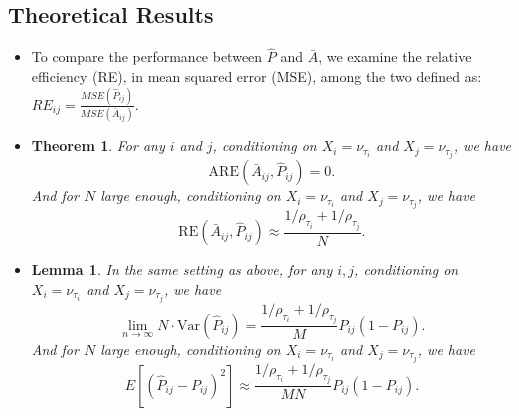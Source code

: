 \documentclass[a4paper]{article}
\newtheorem{lemma}[fact]{Lemma}
\newtheorem{theorem}[fact]{Theorem}
\begin{document}
\subsection{Theoretical Results}
\begin{itemize}
\item To compare the performance between $\hat{P}$ and $\bar{A}$, we examine the relative efficiency (RE), in mean squared error (MSE), among the two defined as: $RE_{ij} = \frac{MSE(\hat{P}_{ij})}{MSE(\bar{A}_{ij})}$.
\item
\begin{theorem}
\label{thm:ARE}
For any $i$ and $j$, conditioning on $X_i = \nu_{\tau_i}$ and $X_j = \nu_{\tau_j}$, we have
\[
	\mathrm{ARE}(\bar{A}_{ij}, \hat{P}_{ij}) = 0.
\]
And for $N$ large enough, conditioning on $X_i = \nu_{\tau_i}$ and $X_j = \nu_{\tau_j}$, we have
\[
	\mathrm{RE}(\bar{A}_{ij}, \hat{P}_{ij}) \approx
    \frac{1/\rho_{\tau_i} + 1/\rho_{\tau_j}}{N}.
\]
\end{theorem}
\item
\begin{lemma}
\label{lm:VarPhat}
In the same setting as above, for any $i, j$, conditioning on $X_i = \nu_{\tau_i}$ and $X_j = \nu_{\tau_j}$, we have
\[
	\lim_{n \to \infty} N \cdot \mathrm{Var}(\hat{P}_{ij}) =
    \frac{1/\rho_{\tau_i} + 1/\rho_{\tau_j}}{M} P_{ij} (1 - P_{ij}).
\]
And for $N$ large enough, conditioning on $X_i = \nu_{\tau_i}$ and $X_j = \nu_{\tau_j}$, we have
\[
	E[(\hat{P}_{ij} - P_{ij})^2] \approx
    \frac{1/\rho_{\tau_i} + 1/\rho_{\tau_j}}{M N} P_{ij}(1-P_{ij}).
\]
\end{lemma}
\end{itemize}
\end{document}
